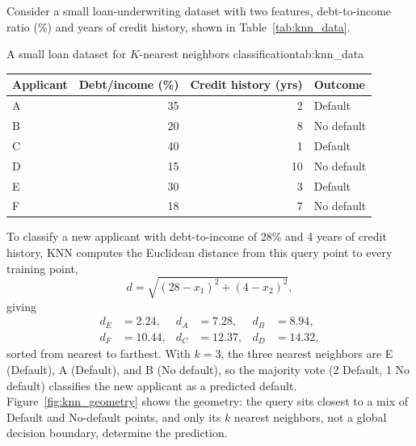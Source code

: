 \documentclass[../ai_in_finance]{subfiles}
\begin{document}
Consider a small loan-underwriting dataset with two features, debt-to-income ratio (\%) and years of credit history, shown in Table~\ref{tab:knn_data}.

\begin{booktable}[htbp]{A small loan dataset for $K$-nearest neighbors classification}{tab:knn_data}
\begin{tabular}{lrrl}
\toprule
Applicant & Debt/income (\%) & Credit history (yrs) & Outcome \\
\midrule
A & 35 & 2  & Default \\
B & 20 & 8  & No default \\
C & 40 & 1  & Default \\
D & 15 & 10 & No default \\
E & 30 & 3  & Default \\
F & 18 & 7  & No default \\
\bottomrule
\end{tabular}
\end{booktable}

To classify a new applicant with debt-to-income of 28\% and 4 years of credit history, KNN computes the Euclidean distance from this query point to every training point,
\begin{equation*}
d = \sqrt{(28 - x_1)^2 + (4 - x_2)^2},
\end{equation*}
giving
\begin{align*}
d_E &= 2.24, & d_A &= 7.28, & d_B &= 8.94, \\
d_F &= 10.44, & d_C &= 12.37, & d_D &= 14.32,
\end{align*}
sorted from nearest to farthest. With $k=3$, the three nearest neighbors are E (Default), A (Default), and B (No default), so the majority vote (2 Default, 1 No default) classifies the new applicant as a predicted default. Figure~\ref{fig:knn_geometry} shows the geometry: the query sits closest to a mix of Default and No-default points, and only its $k$ nearest neighbors, not a global decision boundary, determine the prediction.
\end{document}
